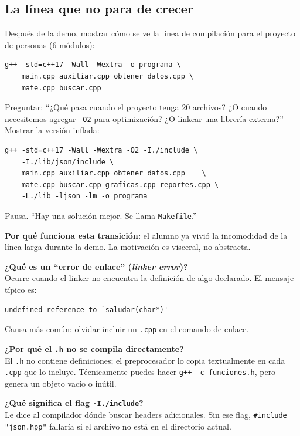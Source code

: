 \documentclass[12pt, oneside]{article}
\begin{document}
\subsection{La línea que no para de crecer}

\begin{notaprofesor}
  Después de la demo, mostrar cómo se ve la línea de compilación para el
  proyecto de personas (6 módulos):
\begin{verbatim}
g++ -std=c++17 -Wall -Wextra -o programa \
    main.cpp auxiliar.cpp obtener_datos.cpp \
    mate.cpp buscar.cpp
\end{verbatim}
  Preguntar: ``¿Qué pasa cuando el proyecto tenga 20 archivos?  ¿O cuando
  necesitemos agregar \texttt{-O2} para optimización?  ¿O linkear una
  librería externa?''  Mostrar la versión inflada:
\begin{verbatim}
g++ -std=c++17 -Wall -Wextra -O2 -I./include \
    -I./lib/json/include \
    main.cpp auxiliar.cpp obtener_datos.cpp    \
    mate.cpp buscar.cpp graficas.cpp reportes.cpp \
    -L./lib -ljson -lm -o programa
\end{verbatim}
  Pausa.  ``Hay una solución mejor.  Se llama \texttt{Makefile}.''
  \par\smallskip
  \textbf{Por qué funciona esta transición:} el alumno ya vivió la incomodidad
  de la línea larga durante la demo.  La motivación es visceral, no abstracta.
\end{notaprofesor}

\begin{notaprofesor}[FAQ: compilación]
  \textbf{¿Qué es un ``error de enlace'' (\textit{linker error})?}\\
  Ocurre cuando el linker no encuentra la definición de algo declarado.
  El mensaje típico es:
\begin{verbatim}
undefined reference to `saludar(char*)'
\end{verbatim}
  Causa más común: olvidar incluir un \texttt{.cpp} en el comando de enlace.

  \medskip
  \textbf{¿Por qué el \texttt{.h} no se compila directamente?}\\
  El \texttt{.h} no contiene definiciones; el preprocesador lo copia
  textualmente en cada \texttt{.cpp} que lo incluye.  Técnicamente puedes
  hacer \texttt{g++ -c funciones.h}, pero genera un objeto vacío o inútil.

  \medskip
  \textbf{¿Qué significa el flag \texttt{-I./include}?}\\
  Le dice al compilador dónde buscar headers adicionales.  Sin ese flag,
  \texttt{\#include "json.hpp"} fallaría si el archivo no está en el
  directorio actual.
\end{notaprofesor}
\end{document}
